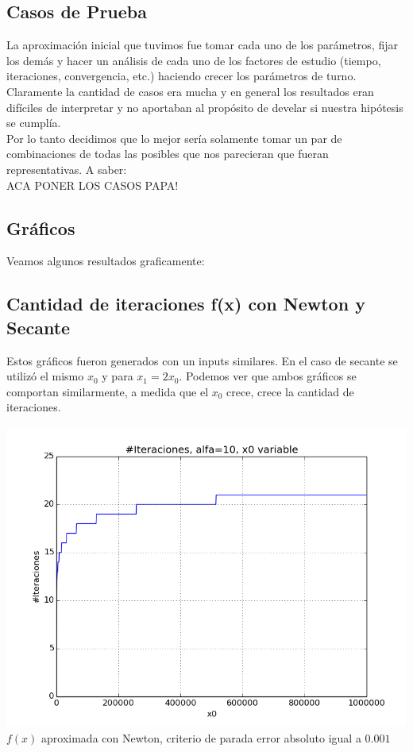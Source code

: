 \subsection{Casos de Prueba}
La aproximación inicial que tuvimos fue tomar cada uno de los parámetros, fijar los demás y hacer un análisis de cada uno de los factores de estudio (tiempo, iteraciones, convergencia, etc.) haciendo crecer los parámetros de turno. Claramente la cantidad de casos era mucha y en general los resultados eran difíciles de interpretar y no aportaban al propósito de develar si nuestra hipótesis se cumplía.\\

Por lo tanto decidimos que lo mejor sería solamente tomar un par de combinaciones de todas las posibles que nos parecieran que fueran representativas. A saber:\\

ACA PONER LOS CASOS PAPA!

\subsection{Gráficos}

Veamos algunos resultados graficamente:

\subsection{Cantidad de iteraciones f(x) con Newton y Secante}
Estos gráficos fueron generados con un inputs similares. En el caso de secante se utilizó el mismo $x_0$ y para $x_1 = 2x_0$. Podemos ver que ambos gráficos se comportan similarmente, a medida que el $x_0$ crece, crece la cantidad de iteraciones.\\

\begin{center}
\includegraphics[scale=0.5]{graficos/iteraciones-f-newton-alfa_fijo-absoluto-0.001-alejando.png}\\
$f(x)$ aproximada con Newton, criterio de parada error absoluto igual a $0.001$
\end{center}


